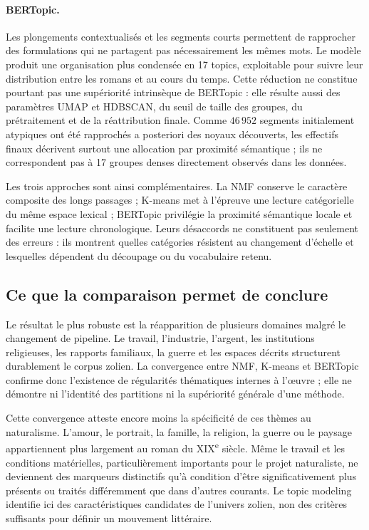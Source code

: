 \paragraph{BERTopic.} Les plongements contextualisés et les segments courts permettent de rapprocher des formulations qui ne partagent pas nécessairement les mêmes mots. Le modèle produit une organisation plus condensée en 17 topics, exploitable pour suivre leur distribution entre les romans et au cours du temps. Cette réduction ne constitue pourtant pas une supériorité intrinsèque de BERTopic : elle résulte aussi des paramètres UMAP et HDBSCAN, du seuil de taille des groupes, du prétraitement et de la réattribution finale. Comme \(46\,952\) segments initialement atypiques ont été rapprochés a posteriori des noyaux découverts, les effectifs finaux décrivent surtout une allocation par proximité sémantique ; ils ne correspondent pas à 17 groupes denses directement observés dans les données.

Les trois approches sont ainsi complémentaires. La NMF conserve le caractère composite des longs passages ; K-means met à l'épreuve une lecture catégorielle du même espace lexical ; BERTopic privilégie la proximité sémantique locale et facilite une lecture chronologique. Leurs désaccords ne constituent pas seulement des erreurs : ils montrent quelles catégories résistent au changement d'échelle et lesquelles dépendent du découpage ou du vocabulaire retenu.

\subsection{Ce que la comparaison permet de conclure}

Le résultat le plus robuste est la réapparition de plusieurs domaines malgré le changement de pipeline. Le travail, l'industrie, l'argent, les institutions religieuses, les rapports familiaux, la guerre et les espaces décrits structurent durablement le corpus zolien. La convergence entre NMF, K-means et BERTopic confirme donc l'existence de régularités thématiques internes à l'œuvre ; elle ne démontre ni l'identité des partitions ni la supériorité générale d'une méthode.

Cette convergence atteste encore moins la spécificité de ces thèmes au naturalisme. L'amour, le portrait, la famille, la religion, la guerre ou le paysage appartiennent plus largement au roman du XIX\textsuperscript{e} siècle. Même le travail et les conditions matérielles, particulièrement importants pour le projet naturaliste, ne deviennent des marqueurs distinctifs qu'à condition d'être significativement plus présents ou traités différemment que dans d'autres courants. Le topic modeling identifie ici des caractéristiques candidates de l'univers zolien, non des critères suffisants pour définir un mouvement littéraire.


